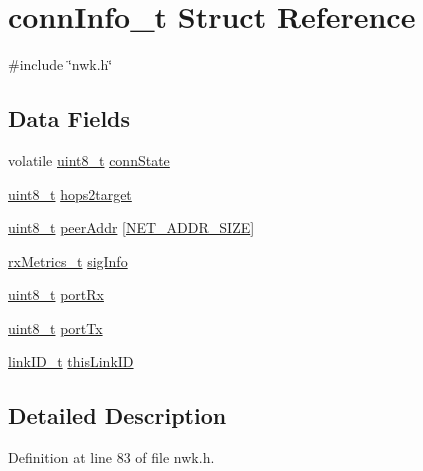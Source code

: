 \hypertarget{structconnInfo__t}{\section{conn\-Info\-\_\-t \-Struct \-Reference}
\label{structconnInfo__t}
}


{\ttfamily \#include \char`\"{}nwk.\-h\char`\"{}}

\subsection*{\-Data \-Fields}
\begin{DoxyCompactItemize}
\item 
volatile \hyperlink{bsp__msp430__defs_8h_aba7bc1797add20fe3efdf37ced1182c5}{uint8\-\_\-t} \hyperlink{structconnInfo__t_ae1d855f6177858d6085c9919b6f21f70}{conn\-State}
\item 
\hyperlink{bsp__msp430__defs_8h_aba7bc1797add20fe3efdf37ced1182c5}{uint8\-\_\-t} \hyperlink{structconnInfo__t_ab8fa97070b038197afbbd287e3d4ce17}{hops2target}
\item 
\hyperlink{bsp__msp430__defs_8h_aba7bc1797add20fe3efdf37ced1182c5}{uint8\-\_\-t} \hyperlink{structconnInfo__t_abc4f4954179a390679e6ed1458753752}{peer\-Addr} \mbox{[}\hyperlink{nwk__types_8h_a0995a88f6bd8e1657ad72b49451b6e24}{\-N\-E\-T\-\_\-\-A\-D\-D\-R\-\_\-\-S\-I\-Z\-E}\mbox{]}
\item 
\hyperlink{structrxMetrics__t}{rx\-Metrics\-\_\-t} \hyperlink{structconnInfo__t_a87903a190e749b4aa6e73a2aa5d18ff1}{sig\-Info}
\item 
\hyperlink{bsp__msp430__defs_8h_aba7bc1797add20fe3efdf37ced1182c5}{uint8\-\_\-t} \hyperlink{structconnInfo__t_adf1599d59a7e9d1f482180b183aab48b}{port\-Rx}
\item 
\hyperlink{bsp__msp430__defs_8h_aba7bc1797add20fe3efdf37ced1182c5}{uint8\-\_\-t} \hyperlink{structconnInfo__t_ad86d0317b274fcbe4afb501072a6483f}{port\-Tx}
\item 
\hyperlink{nwk__types_8h_a542d45d12faba7ae8fd0c989ef2c8528}{link\-I\-D\-\_\-t} \hyperlink{structconnInfo__t_aa316c2271456d83341ee386bf74e558f}{this\-Link\-I\-D}
\end{DoxyCompactItemize}


\subsection{\-Detailed \-Description}


\-Definition at line 83 of file nwk.\-h.



